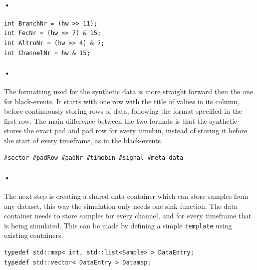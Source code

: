 \documentclass[a4paper, 12pt]{report}
\newcommand{\codeword}[1]{\texttt{#1}}
\begin{document}
\paragraph{•}
\begin{minipage}{\linewidth}
\begin{lstlisting}[caption=Bitwise operation to retrieve values from the hardware address., label=lst:bit-operation]
int BranchNr = (hw >> 11);
int FecNr = (hw >> 7) & 15;
int AltroNr = (hw >> 4) & 7;
int ChannelNr = hw & 15;
\end{lstlisting}
\end{minipage}

\paragraph{•}
The formatting used for the synthetic data is more straight forward then the one for black-events.
It starts with one row with the title of values in its column, before continuously storing rows of data, following the format specified in the first row.
The main difference between the two formats is that the synthetic stores the exact pad and pad row for every timebin, instead of storing it before the start of every timeframe, as in the black-events.

\begin{lstlisting}[caption=Format for the synthetic dataset., label=lst:synthetic-data-format]
#sector #padRow #padNr #timebin #signal #meta-data
\end{lstlisting}

\paragraph{•}
The next step is creating a shared data container which can store samples from any dataset, this way the simulation only needs one sink function.
The data container needs to store samples for every channel, and for every timeframe that is being simulated.
This can be made by defining a simple \codeword{template} using existing containers.

\begin{lstlisting}[caption=Data container., label=lst:data-template]
typedef std::map< int, std::list<Sample> > DataEntry;
typedef std::vector< DataEntry > Datamap;
\end{lstlisting}
\end{document}
